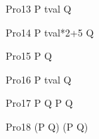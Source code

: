 \begin{circus}
    \circprocess Pro13 \circdef P \circtimedinterrupt \lcirctime tval \rcirctime Q\\
\end{circus}        

\begin{circus}
   \circprocess Pro14 \circdef P \circtimedinterrupt \lcirctime tval*2+5 \rcirctime Q\\
\end{circus}        

\begin{circus}
    \circprocess Pro15 \circdef P \circtimedinterrupt {}  \rcirctime Q\\
\end{circus}        

\begin{circus}
    \circprocess Pro16 \circdef P \circtimedinterrupt {} \upto tval \rcirctime  Q\\
\end{circus} 

\begin{circus}
    \circprocess Pro17 \circdef P \circtimedinterrupt {} \rcirctime Q \circinterrupt P \circtimedinterrupt {} \rcirctime Q \\ 
\end{circus}
    
\begin{circus}
    \circprocess Pro18 \circdef (P \circtimedinterrupt {} \rcirctime Q) \circinterrupt (P \circtimedinterrupt {} \rcirctime Q) \\
\end{circus}





